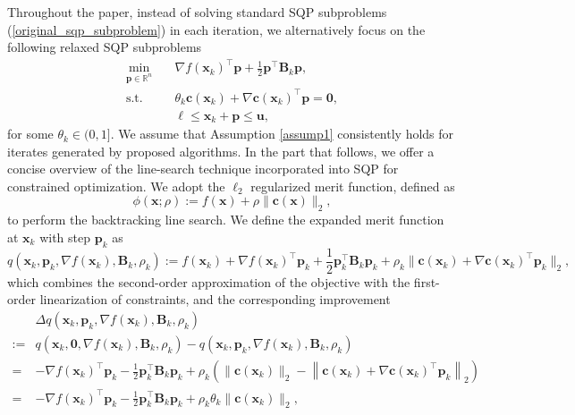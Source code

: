 \documentclass[aos]{imsart}
\numberwithin{equation}{section}
\theoremstyle{plain}
\begin{document}
Throughout the paper, instead of solving standard SQP subproblems (\ref{original_sqp_subproblem}) in each iteration, we alternatively focus on the following relaxed SQP subproblems
\begin{equation}
\label{relaxed_sqp_subproblem}
    \begin{split}
        \min_{\bm{p} \in \mathbb{R}^{n}} & \hspace{1em} \nabla f(\bm{x}_k)^{\top}\bm{p}+ \frac{1}{2}\bm{p}^{\top}\bm{B}_k\bm{p},\\
        \text{s.t.} & \hspace{1em} \theta_k \bm{c}(\bm{x}_k)+\nabla \bm{c}(\bm{x}_k)^{\top}\bm{p} = \bm{0},\\
        & \hspace{1em} \bm{\ell} \leq \bm{x}_k + \bm{p} \leq \bm{u},
    \end{split}    
\end{equation} 
for some $\theta_k \in (0,1]$.
We assume that Assumption \ref{assump1} consistently holds for iterates generated by proposed algorithms.
In the part that follows, we offer a concise overview of the line-search technique incorporated into SQP for constrained optimization.
We adopt the $\ell_2$ regularized merit function, defined as
\begin{equation}
    \phi(\bm{x};\rho):= f(\bm{x}) + \rho \|\bm{c}(\bm{x})\|_2,
\end{equation}
to perform the backtracking line search. We define the expanded merit function at $\bm{x}_k$ with step $\bm{p}_k$ as 
\begin{equation}
    q(\bm{x}_k,\bm{p}_k,\nabla f(\bm{x}_k),\bm{B}_k,\rho_k) := f(\bm{x}_{k}) + \nabla f(\bm{x}_k)^{\top} \bm{p}_k + \frac{1}{2} \bm{p}_k^{\top} \bm{B}_k \bm{p}_k + \rho_k \|\bm{c}(\bm{x}_k) + \nabla \bm{c}(\bm{x}_k)^{\top}\bm{p}_k\|_2,
\end{equation}
which combines the second-order approximation of the objective with the first-order linearization of constraints, and the corresponding improvement \begin{equation}
\begin{split}
    & \Delta q(\bm{x}_k,\bm{p}_k,\nabla f(\bm{x}_k), \bm{B}_k,\rho_k)\\
    := & q(\bm{x}_k,\bm{0},\nabla f(\bm{x}_k),\bm{B}_k,\rho_k) - q(\bm{x}_k,\bm{p}_k,\nabla f(\bm{x}_k),\bm{B}_k,\rho_k)\\
    = & -\nabla f(\bm{x}_k)^{\top} \bm{p}_k - \frac{1}{2} \bm{p}_k^{\top} \bm{B}_k \bm{p}_k + \rho_k \left(\|\bm{c}(\bm{x}_k)\|_2 - \left\|\bm{c}(\bm{x}_k) + \nabla \bm{c}(\bm{x}_k)^{\top}\bm{p}_k\right\|_2 \right)\\
    = & -\nabla f(\bm{x}_k)^{\top} \bm{p}_k - \frac{1}{2} \bm{p}_k^{\top} \bm{B}_k \bm{p}_k + \rho_k \theta_k \|\bm{c}(\bm{x}_k)\|_2,
\end{split}
\end{equation}
\end{document}
